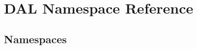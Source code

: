 \hypertarget{namespace_d_a_l}{}\section{D\+AL Namespace Reference}
\label{namespace_d_a_l}
\subsection*{Namespaces}
\begin{DoxyCompactItemize}
\end{DoxyCompactItemize}
